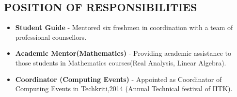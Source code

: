 \documentclass[margin, 10pt]{res} %
\begin{document}
\begin{resume}
\section{POSITION OF RESPONSIBILITIES}
\begin{itemize}
\item {\bf Student Guide} - Mentored six freshmen in coordination with a team of professional counsellors.
\item {\bf Academic Mentor(Mathematics)} - Providing academic assistance to those students in Mathematics courses(Real Analysis, Linear Algebra).
\item {\bf Coordinator (Computing Events)} - Appointed as Coordinator of Computing Events in Techkriti,2014 (Annual Technical festival of IITK).
\end{itemize}
\end{resume}
\end{document}
